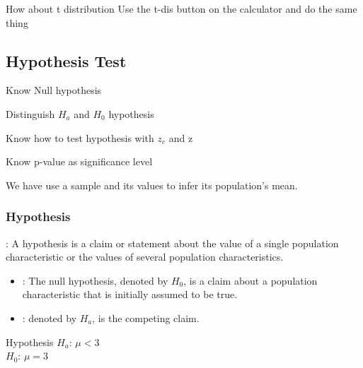 \begin{Question}
    How about t distribution
    \solution Use the t-dis button on the calculator and do the same thing
\end{Question}

\subsection{Hypothesis Test}
\begin{objectives}
    \item Know Null hypothesis
    \item Distinguish \(H_a\) and \(H_0\) hypothesis
    \item Know how to test hypothesis with \(z_c\) and z
    \item Know p-value as significance level
\end{objectives}
\vbox{}
We have use a sample and its values to infer its population's mean.

\subsubsection{Hypothesis}
: A hypothesis is a claim or statement about the value of a single population characteristic or the values of several population characteristics. 
\begin{itemize}
    \item {}: The null hypothesis, denoted by \(H_0\), is a claim about a population characteristic that is initially assumed to be true.
    \item {}: denoted by \(H_a\), is the competing claim.
\end{itemize}
\begin{examplebox}{Hypothesis}
    \(H_a\): \(\mu <3\) \\
    \(H_0\): \(\mu =3\)
\end{examplebox}

